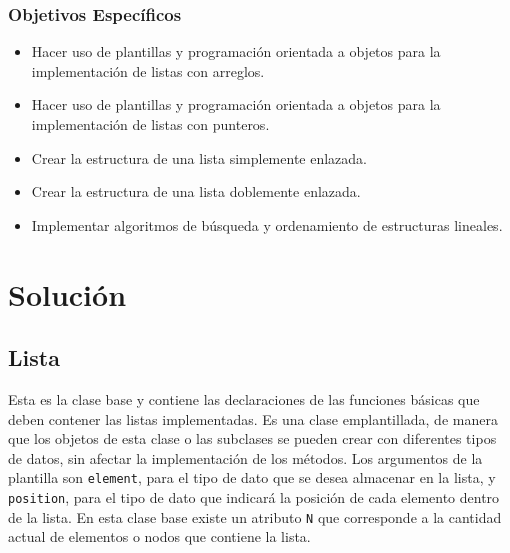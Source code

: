 \subsubsection{Objetivos Específicos}
\begin{itemize}
\item Hacer uso de plantillas y programación orientada a objetos para la implementación de listas con arreglos.
\item Hacer uso de plantillas y programación orientada a objetos para la implementación de listas con punteros.
\item Crear la estructura de una lista simplemente enlazada.
\item Crear la estructura de una lista doblemente enlazada.
\item Implementar algoritmos de búsqueda y ordenamiento de estructuras lineales.
\end{itemize}

\newpage

 


\section{Solución}


\subsection{Lista}

Esta es la clase base y contiene las declaraciones de las funciones básicas que deben contener las listas implementadas. Es una clase emplantillada, de manera que los objetos de esta clase o las subclases se pueden crear con diferentes tipos de datos, sin afectar la implementación de los métodos. Los argumentos de la plantilla son \texttt{element}, para el tipo de dato que se desea almacenar en la lista, y \texttt{position}, para el tipo de dato que indicará la posición de cada elemento dentro de la lista. En esta clase base existe un atributo \texttt{N} que corresponde a la cantidad actual de elementos o nodos que contiene la lista.

